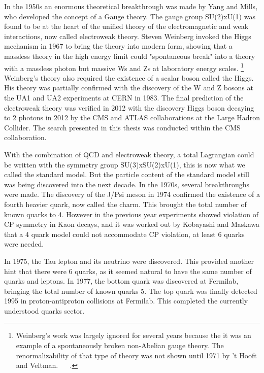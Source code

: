    In the 1950s an enormous theoretical breakthrough was made by Yang and Mills, who developed the concept of a Gauge theory. The gauge group SU(2)xU(1) was found to be at the heart of the unified theory of the electromagnetic and weak interactions, now called electroweak theory. Steven Weinberg invoked the Higgs mechanism in 1967 to bring the theory into modern form, showing that a massless theory in the high energy limit could "spontaneous break" into a theory with a massless photon but massive Ws and Zs at laboratory energy scales. \footnote{Weinberg's work was largely ignored for several years because the it was an example of a spontaneously broken non-Abelian gauge theory. The renormalizability of that type of theory was not shown until 1971 by 't Hooft and Veltman. ~\cite{thooft_nonabelian} ~\cite{ellis_gluon}.} Weinberg's theory also required the existence of a scalar boson called the Higgs. \cite{Weinberg_EWK} His theory was partially confirmed with the discovery of the W and Z bosons at the UA1 and UA2 experiments at CERN in 1983. The final prediction of the electroweak theory was verified in 2012 with the discovery Higgs boson decaying to 2 photons in 2012 by the CMS and ATLAS collaborations at the Large Hadron Collider. \cite{CMS_higgs,ATLAS_higgs} The search presented in this thesis was conducted within the CMS collaboration.

    With the combination of QCD and electroweak theory, a total Lagrangian could be written with the symmetry group SU(3)xSU(2)xU(1), this is now what we called the standard model. But the particle content of the standard model still was being discovered into the next decade. In the 1970s, several breakthroughs were made. The discovery of the J/Psi meson in 1974 confirmed the existence of a fourth heavier quark, now called the charm. This brought the total number of known quarks to 4. However in the previous year experiments showed violation of CP symmetry in Kaon decays, and it was worked out by Kobayashi and Maskawa that a 4 quark model could not accommodate CP violation, at least 6 quarks were needed. 

    In 1975, the Tau lepton and its neutrino were discovered. This provided another hint that there were 6 quarks, as it seemed natural to have the same number of quarks and leptons. In 1977, the bottom quark was discovered at Fermilab, bringing the total number of known quarks 5. The top quark was finally detected 1995 in proton-antiproton collisions at Fermilab. This completed the currently understood quarks sector. 

